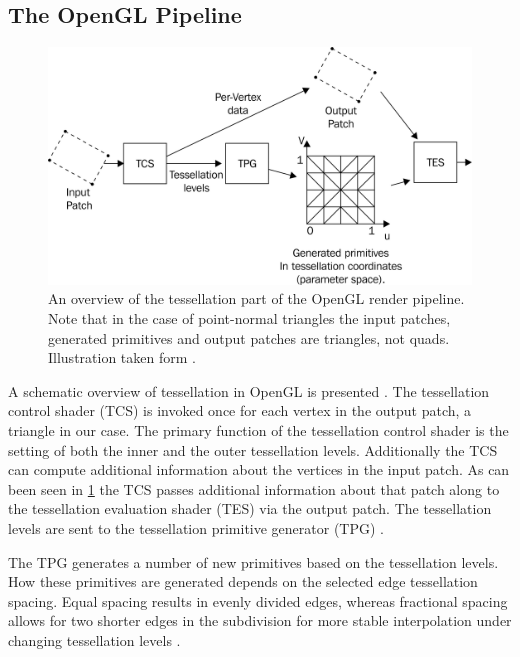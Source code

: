 \subsection{The OpenGL Pipeline}
\label{ss:implementation:pipeline}

	\begin{figure}
		\centering
		\includegraphics[width=\columnwidth]{content/img/implementation/tesselationPipeline.png}
		\caption{An overview of the tessellation part of the OpenGL render pipeline. Note that in the case of point-normal triangles the input patches, generated primitives and output patches are triangles, not quads. Illustration taken form \textcite{wolff2013opengl}.}
		\label{fig:implementation:tessellationPipeline}
	\end{figure}

	A schematic overview of tessellation in OpenGL is presented .
	The tessellation control shader (TCS) is invoked once for each vertex in the output patch, a triangle in our case. 
	The primary function of the tessellation control shader is the setting of both the inner and the outer tessellation levels. Additionally the TCS can compute additional information about the vertices in the input patch. 
	As can been seen in \cref{fig:implementation:tessellationPipeline} the TCS passes additional information about that patch along to the tessellation evaluation shader (TES) via the output patch. The tessellation levels are sent to the tessellation primitive generator (TPG) \cite{wolff2013opengl}.

	The TPG generates a number of new primitives based on the tessellation levels. How these primitives are generated depends on the selected edge tessellation spacing. Equal spacing results in evenly divided edges, whereas fractional spacing allows for two shorter edges in the subdivision for more stable interpolation under changing tessellation levels \cite{wolff2013opengl,openGL41Core}.

